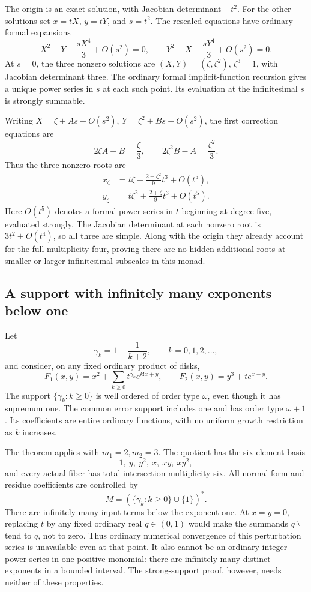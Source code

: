 \documentclass[11pt,oneside]{article}
\numberwithin{equation}{section}
\theoremstyle{definition}
\theoremstyle{remark}\newtheorem{remark}[theorem]{Remark}
\begin{document}
The origin is an exact solution, with Jacobian determinant \(-t^2\). For the other solutions set \(x=tX\), \(y=tY\), and \(s=t^2\). The rescaled equations have ordinary formal expansions
\[
 X^2-Y-\frac{sX^4}{3}+O(s^2)=0,
 \qquad
 Y^2-X-\frac{sY^4}{3}+O(s^2)=0.
\]
At \(s=0\), the three nonzero solutions are \((X,Y)=(\zeta,\zeta^2)\), \(\zeta^3=1\), with Jacobian determinant three. The ordinary formal implicit-function recursion gives a unique power series in \(s\) at each such point. Its evaluation at the infinitesimal \(s\) is strongly summable.

Writing \(X=\zeta+As+O(s^2)\), \(Y=\zeta^2+Bs+O(s^2)\), the first correction equations are
\[
 2\zeta A-B=\frac\zeta3,\qquad
 2\zeta^2B-A=\frac{\zeta^2}3.
\]
Thus the three nonzero roots are
\begin{align}
 x_\zeta&=t\zeta+\frac{2+\zeta^2}{9}t^3+O(t^5),\\
 y_\zeta&=t\zeta^2+\frac{2+\zeta}{9}t^3+O(t^5).
 \label{eq:sineroots}
\end{align}
Here \(O(t^5)\) denotes a formal power series in \(t\) beginning at degree five, evaluated strongly. The Jacobian determinant at each nonzero root is \(3t^2+O(t^4)\), so all three are simple. Along with the origin they already account for the full multiplicity four, proving there are no hidden additional roots at smaller or larger infinitesimal subscales in this monad.

\subsection{A support with infinitely many exponents below one}\label{subsec:nondiscrete}
Let
\[
 \gamma_k=1-\frac1{k+2},\qquad k=0,1,2,\ldots,
\]
and consider, on any fixed ordinary product of disks,
\begin{equation}\label{eq:nondiscreteexample}
 F_1(x,y)=x^2+\sum_{k\geq0}t^{\gamma_k}e^{k!x+y},
 \qquad
 F_2(x,y)=y^3+t e^{x-y}.
\end{equation}
The support \(\{\gamma_k:k\geq0\}\) is well ordered of order type \(\omega\), even though it has supremum one. The common error support includes one and has order type \(\omega+1\). Its coefficients are entire ordinary functions, with no uniform growth restriction as \(k\) increases.

The theorem applies with \(m_1=2,m_2=3\). The quotient has the six-element basis
\[
 1,\ y,\ y^2,\ x,\ xy,\ xy^2,
\]
and every actual fiber has total intersection multiplicity six. All normal-form and residue coefficients are controlled by
\[
 M=\left(\{\gamma_k:k\geq0\}\cup\{1\}\right)^*.
\]
There are infinitely many input terms below the exponent one. At \(x=y=0\), replacing \(t\) by any fixed ordinary real \(q\in(0,1)\) would make the summands \(q^{\gamma_k}\) tend to \(q\), not to zero. Thus ordinary numerical convergence of this perturbation series is unavailable even at that point. It also cannot be an ordinary integer-power series in one positive monomial: there are infinitely many distinct exponents in a bounded interval. The strong-support proof, however, needs neither of these properties.
\end{document}
